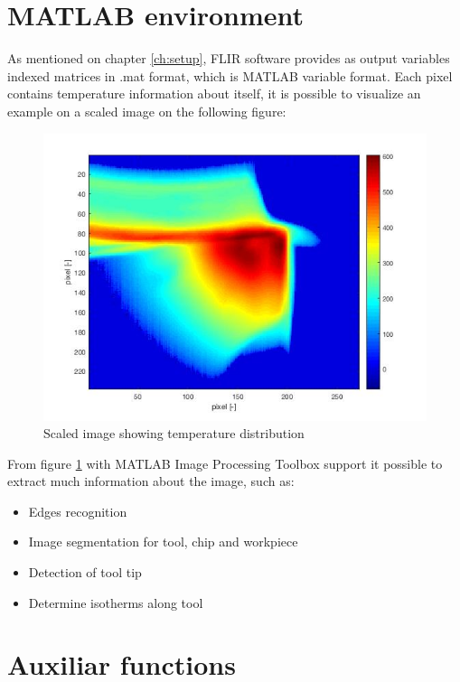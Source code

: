 \section{MATLAB environment}
	As mentioned on chapter \ref{ch:setup}, FLIR software provides as output variables indexed matrices in .mat format, which is MATLAB variable format. Each pixel contains temperature information about itself, it is possible to visualize an example on a scaled image on the following figure:

	\begin{figure}[H]
		\centering
		\captionsetup{justification=centering}
		\includegraphics[scale=0.6]{Cap4/TempDist.jpg}
		\caption{Scaled image showing temperature distribution}
		\label{fig:tempdist}
	\end{figure}

	From figure \ref{fig:tempdist} with MATLAB Image Processing Toolbox support it possible to extract much information about the image, such as:

	\begin{itemize}
		\item Edges recognition
		\item Image segmentation for tool, chip and workpiece
		\item Detection of tool tip
		\item Determine isotherms along tool
	\end{itemize}
	
\section{Auxiliar functions}
